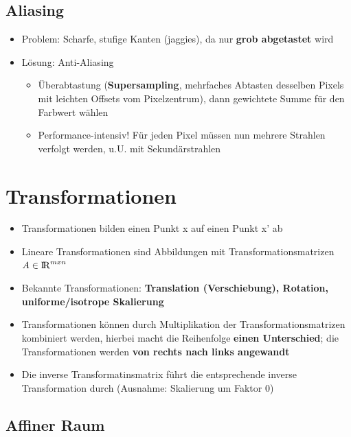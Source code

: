 \documentclass[10pt,a4paper]{article}
\def\realnumbers{{\rm I\!R}}
\begin{document}
        \subsection{Aliasing}
	\label{rt:sub:aliasing}
	
	\begin{itemize}
		\item Problem: Scharfe, stufige Kanten (\glqq jaggies\grqq), da nur \textbf{grob abgetastet} wird
		\item Lösung: Anti-Aliasing
		\begin{itemize}
			\item Überabtastung (\textbf{Supersampling}, mehrfaches Abtasten desselben Pixels mit leichten Offsets vom Pixelzentrum), dann gewichtete Summe für den Farbwert wählen
			\item Performance-intensiv! Für jeden Pixel müssen nun mehrere Strahlen verfolgt werden, u.U. mit Sekundärstrahlen
		\end{itemize}
	\end{itemize}

	\newpage
	\section{Transformationen}
	\label{tf:sec:transformationen}
	
	\begin{itemize}
		\item Transformationen bilden einen Punkt x auf einen Punkt x' ab
		\item Lineare Transformationen sind Abbildungen mit Transformationsmatrizen $A \in \realnumbers^{mxn}$
		\item Bekannte Transformationen: \textbf{Translation (Verschiebung), Rotation, uniforme/isotrope Skalierung}
		\item Transformationen können durch Multiplikation der Transformationsmatrizen kombiniert werden, hierbei macht die Reihenfolge \textbf{einen Unterschied}; die Transformationen werden \textbf{von rechts nach links angewandt}
		\item Die inverse Transformatinsmatrix führt die entsprechende inverse Transformation durch (Ausnahme: Skalierung um Faktor 0)
	\end{itemize}

	\subsection{Affiner Raum}
	\label{tf:sub:affiner_raum}
\end{document}
